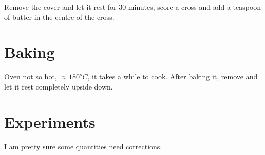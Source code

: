 Remove the cover and let it rest for $30$ minutes, score a cross and add a teaspoon of butter in the centre of the cross.

\section{Baking}

Oven not so hot, $\approx180^oC$, it takes a while to cook.
%
After baking it, remove and let it rest completely upside down.
  
\section{Experiments}

I am pretty sure some quantities need corrections.

